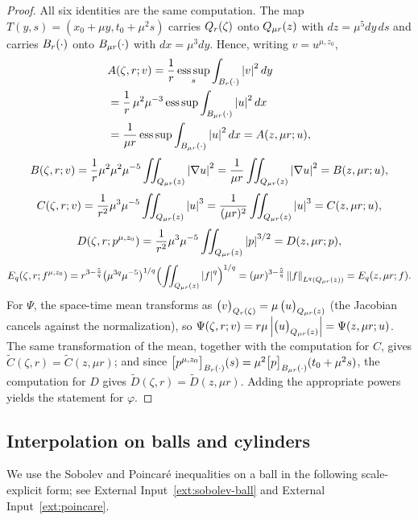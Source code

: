 \documentclass[11pt,reqno]{amsart}
\begin{document}
\begin{proof}
All six identities are the same computation. The map
$T(y,s)=(x_{0}+\mu y,t_{0}+\mu^{2}s)$ carries $Q_{r}(\zeta)$ onto $Q_{\mu r}(z)$
with $dz=\mu^{5}dy\,ds$ and carries $B_{r}(\cdot)$ onto $B_{\mu r}(\cdot)$
with $dx=\mu^{3}dy$. Hence, writing $v=u^{\mu,z_{0}}$,
\[\begin{aligned}
  &A(\zeta,r;v)=\frac1r\operatorname*{ess\,sup}_{s}\int_{B_{r}(\cdot)}\left\lvert v \right\rvert^{2}dy
  \\ &=\frac1r\,\mu^{2}\mu^{-3}\operatorname*{ess\,sup}\int_{B_{\mu r}(\cdot)}\left\lvert u \right\rvert^{2}dx
  \\ &=\frac{1}{\mu r}\operatorname*{ess\,sup}\int_{B_{\mu r}(\cdot)}\left\lvert u \right\rvert^{2}dx
  =A(z,\mu r;u),
\end{aligned}\]
\[
  B(\zeta,r;v)=\frac1r\mu^{2}\mu^{2}\mu^{-5}\iint_{Q_{\mu r}(z)}\left\lvert \nabla u \right\rvert^{2}
   =\frac{1}{\mu r}\iint_{Q_{\mu r}(z)}\left\lvert \nabla u \right\rvert^{2}=B(z,\mu r;u),
\]
\[
  C(\zeta,r;v)=\frac1{r^{2}}\mu^{3}\mu^{-5}\iint_{Q_{\mu r}(z)}\left\lvert u \right\rvert^{3}
   =\frac{1}{(\mu r)^{2}}\iint_{Q_{\mu r}(z)}\left\lvert u \right\rvert^{3}=C(z,\mu r;u),
\]
\[
  D(\zeta,r;p^{\mu,z_{0}})=\frac1{r^{2}}\mu^{3}\mu^{-5}\iint_{Q_{\mu r}(z)}\left\lvert p \right\rvert^{3/2}
   =D(z,\mu r;p),
\]
\[
  E_{q}(\zeta,r;f^{\mu,z_{0}})
   =r^{3-\frac5q}\bigl(\mu^{3q}\mu^{-5}\bigr)^{1/q}\Bigl(\iint_{Q_{\mu r}(z)}\left\lvert f \right\rvert^{q}\Bigr)^{1/q}
   =(\mu r)^{3-\frac5q}\left\lVert f \right\rVert_{L^{q}(Q_{\mu r}(z))}=E_{q}(z,\mu r;f).
\]
For $\Psi$, the space-time mean transforms as
$\bigl(v\bigr)_{Q_{r}(\zeta)}=\mu\,\bigl(u\bigr)_{Q_{\mu r}(z)}$ (the Jacobian cancels
against the normalization), so
$\Psi(\zeta,r;v)=r\mu\left\lvert \bigl(u\bigr)_{Q_{\mu r}(z)} \right\rvert=\Psi(z,\mu r;u)$. The same
transformation of the mean, together with the computation for $C$, gives
$\widetilde C(\zeta,r)=\widetilde C(z,\mu r)$; and since
$\bigl[p^{\mu,z_{0}}\bigr]_{B_{r}(\cdot)}(s)=\mu^{2}\bigl[p\bigr]_{B_{\mu r}(\cdot)}(t_{0}+\mu^{2}s)$,
the computation for $D$ gives $\widetilde D(\zeta,r)=\widetilde D(z,\mu r)$.
Adding the appropriate powers yields the statement for $\varphi$.
\end{proof}

\subsection{Interpolation on balls and cylinders}\label{ss:interpolation}

We use the Sobolev and Poincar\'e inequalities on a ball in the following
scale-explicit form; see External Input~\ref{ext:sobolev-ball} and
External Input~\ref{ext:poincare}.
\end{document}

